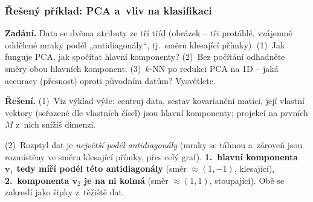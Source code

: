 \subsubsection*{Řešený příklad: PCA a~vliv na klasifikaci}

\begin{priklad}
\par
\textbf{Zadání.} Data se dvěma atributy ze tří tříd (obrázek -- tři protáhlé, vzájemně oddělené mraky podél „antidiagonály``, tj.\ směru klesající přímky). (1)~Jak funguje PCA, jak spočítat hlavní komponenty? (2)~Bez počítání odhadněte směry obou hlavních komponent. (3)~$k$-NN po redukci PCA na 1D -- jaká accuracy (přesnost) oproti původním datům? Vysvětlete.

\smallskip
\textbf{Řešení.} (1)~Viz výklad výše: centruj data, sestav kovarianční matici, její vlastní vektory (seřazené dle vlastních čísel) jsou hlavní komponenty; projekcí na prvních $M$ z~nich snížíš dimenzi.

(2)~Rozptyl dat je \emph{největší podél antidiagonály} (mraky se táhnou a~zároveň jsou rozmístěny ve směru klesající přímky, přes celý graf). \textbf{1.~hlavní komponenta $\mathbf{v}_1$ tedy míří podél této antidiagonály} (směr $\approx(1,-1)$, klesající), \textbf{2.~komponenta $\mathbf{v}_2$ je na ni kolmá} (směr $\approx(1,1)$, stoupající). Obě se zakreslí jako šipky z~těžiště dat.


\end{priklad}
